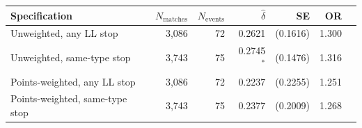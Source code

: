 \begin{tabular}{lrrrrrr}
\toprule
Specification & $N_{\text{matches}}$ & $N_{\text{events}}$ & $\hat{\delta}$ & SE & OR \\
\midrule
Unweighted, any LL stop & 3,086 & 72 & 0.2621 & (0.1616) & 1.300 \\
Unweighted, same-type stop & 3,743 & 75 & 0.2745$^{*}$ & (0.1476) & 1.316 \\
Points-weighted, any LL stop & 3,086 & 72 & 0.2237 & (0.2255) & 1.251 \\
Points-weighted, same-type stop & 3,743 & 75 & 0.2377 & (0.2009) & 1.268 \\
\bottomrule
\end{tabular}
